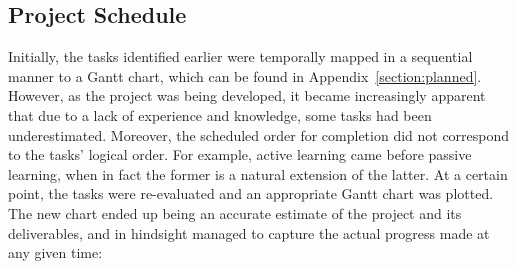 \documentclass[a4paper,12pt]{article}
\begin{document}
\subsection{Project Schedule}
Initially, the tasks identified earlier were temporally mapped in a sequential manner to a Gantt chart, which can be found in Appendix~\ref{section:planned}. However, as the project was being developed, it became increasingly apparent that due to a lack of experience and knowledge, some tasks had been underestimated. Moreover, the scheduled order for completion did not correspond to the tasks' logical order. For example, active learning came before passive learning, when in fact the former is a natural extension of the latter. At a certain point, the tasks were re-evaluated and an appropriate Gantt chart was plotted. The new chart ended up being an accurate estimate of the project and its deliverables, and in hindsight managed to capture the actual progress made at any given time:
\end{document}
